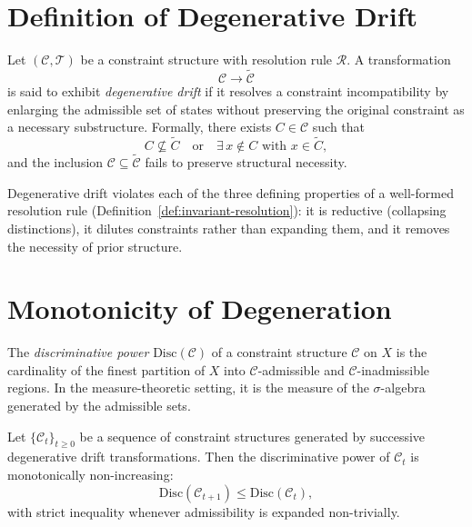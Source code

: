 \documentclass[11pt,openany]{book}
\begin{document}
\section{Definition of Degenerative Drift}
\label{sec:definition-drift}

\begin{definition}
\label{def:degenerative-drift}
Let $(\mathcal{C}, \mathcal{T})$ be a constraint structure
with resolution rule $\mathcal{R}$.  A transformation
\[
  \mathcal{C} \longrightarrow \widetilde{\mathcal{C}}
\]
is said to exhibit \emph{degenerative drift} if it resolves
a constraint incompatibility by enlarging the admissible
set of states without preserving the original constraint as
a necessary substructure.  Formally, there exists
$C \in \mathcal{C}$ such that
\[
  C \not\subseteq \widetilde{C}
  \quad \text{or} \quad
  \exists\, x \notin C \text{ with } x \in \widetilde{C},
\]
and the inclusion $\mathcal{C} \subseteq \widetilde{\mathcal{C}}$
fails to preserve structural necessity.
\end{definition}

\begin{remark}
Degenerative drift violates each of the three defining
properties of a well-formed resolution rule
(Definition~\ref{def:invariant-resolution}): it is
reductive (collapsing distinctions), it dilutes constraints
rather than expanding them, and it removes the necessity
of prior structure.
\end{remark}

\section{Monotonicity of Degeneration}
\label{sec:monotonicity}

\begin{definition}
\label{def:discriminative-power}
The \emph{discriminative power} $\mathrm{Disc}(\mathcal{C})$
of a constraint structure $\mathcal{C}$ on $X$ is the
cardinality of the finest partition of $X$ into
$\mathcal{C}$-admissible and $\mathcal{C}$-inadmissible
regions.  In the measure-theoretic setting, it is the
measure of the $\sigma$-algebra generated by the admissible
sets.
\end{definition}

\begin{theorem}
\label{thm:monotonic-degeneration}
Let $\{\mathcal{C}_t\}_{t \ge 0}$ be a sequence of
constraint structures generated by successive degenerative
drift transformations.  Then the discriminative power of
$\mathcal{C}_t$ is monotonically non-increasing:
\[
  \mathrm{Disc}(\mathcal{C}_{t+1}) \le
  \mathrm{Disc}(\mathcal{C}_t),
\]
with strict inequality whenever admissibility is expanded
non-trivially.
\end{theorem}
\end{document}
